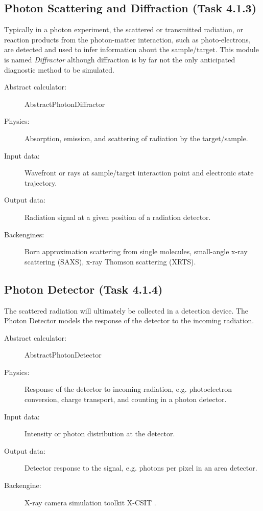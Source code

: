 \documentclass[12pt]{scrartcl}
\begin{document}
\subsection{Photon Scattering and Diffraction (Task 4.1.3)}
Typically in a photon experiment, the scattered or transmitted radiation, or
reaction products from the photon-matter interaction, such as photo-electrons,
are detected and used to infer information about the sample/target.  This module
is named \textit{Diffractor} although diffraction is by far not the only
anticipated diagnostic method to be simulated.  \begin{description}
  \item[Abstract calculator:] AbstractPhotonDiffractor
  \item[Physics:] Absorption, emission, and scattering of radiation by the target/sample.
  \item[Input data:] Wavefront or rays at sample/target interaction point and
    electronic state trajectory.
  \item[Output data:] Radiation signal at a given position of a radiation detector.
  \item[Backengines:] Born approximation scattering from single molecules,
    small-angle x-ray scattering (SAXS), x-ray Thomson
    scattering (XRTS).
\end{description}
%
\subsection{Photon Detector (Task 4.1.4)}
The scattered radiation will ultimately  be collected in a detection device. The
Photon Detector models the response of the detector to the incoming radiation.
\begin{description}
  \item[Abstract calculator:] AbstractPhotonDetector
  \item[Physics:] Response of the detector to incoming radiation, e.g.
    photoelectron conversion, charge transport, and counting in a photon
    detector.
  \item[Input data:] Intensity or photon distribution at the detector.
  \item[Output data:] Detector response to the signal, e.g. photons per pixel in an area detector.
  \item[Backengine:] X-ray camera simulation toolkit X-CSIT \cite{Joy2015}.
\end{description}
%
\end{document}
